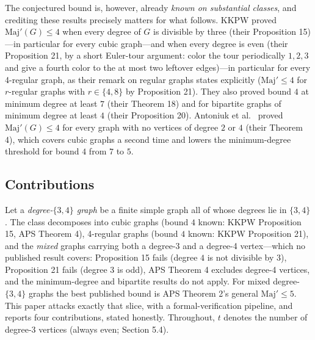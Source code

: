 \documentclass[11pt]{article}
\theoremstyle{definition}
\theoremstyle{remark}
\newcommand{\Maj}{\ensuremath{\mathrm{Maj}'}}
\begin{document}
The conjectured bound is, however, already \emph{known on substantial classes}, and crediting these results precisely matters for what follows. KKPW \cite{KKPW} proved $\Maj(G) \le 4$ when every degree of $G$ is divisible by three (their Proposition 15)---in particular for every cubic graph---and when every degree is even (their Proposition 21, by a short Euler-tour argument: color the tour periodically $1,2,3$ and give a fourth color to the at most two leftover edges)---in particular for every 4-regular graph, as their remark on regular graphs states explicitly ($\Maj \le 4$ for $r$-regular graphs with $r \in \{4,8\}$ by Proposition 21). They also proved bound $4$ at minimum degree at least $7$ (their Theorem 18) and for bipartite graphs of minimum degree at least $4$ (their Proposition 20). Antoniuk et al.\ \cite{APS} proved $\Maj(G) \le 4$ for every graph with no vertices of degree $2$ or $4$ (their Theorem 4), which covers cubic graphs a second time and lowers the minimum-degree threshold for bound $4$ from $7$ to $5$.

\subsection{Contributions}\label{12-contributions}

Let a \emph{degree-$\{3,4\}$ graph} be a finite simple graph all of whose degrees lie in $\{3,4\}$. The class decomposes into cubic graphs (bound $4$ known: KKPW Proposition 15, APS Theorem 4), 4-regular graphs (bound $4$ known: KKPW Proposition 21), and the \emph{mixed} graphs carrying both a degree-3 and a degree-4 vertex---which no published result covers: Proposition 15 fails (degree $4$ is not divisible by $3$), Proposition 21 fails (degree $3$ is odd), APS Theorem 4 excludes degree-4 vertices, and the minimum-degree and bipartite results do not apply. For mixed degree-$\{3,4\}$ graphs the best published bound is APS Theorem 2's general $\Maj \le 5$. This paper attacks exactly that slice, with a formal-verification pipeline, and reports four contributions, stated honestly. Throughout, $t$ denotes the number of degree-3 vertices (always even; Section 5.4).
\end{document}
